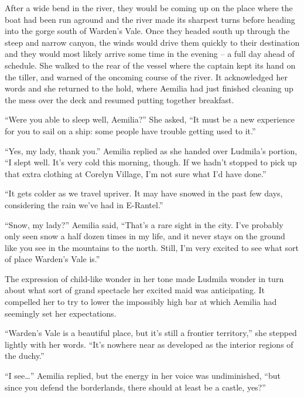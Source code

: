  

After a wide bend in the river, they would be coming up on the place where the boat had been run aground and the river made its sharpest turns before heading into the gorge south of Warden’s Vale. Once they headed south up through the steep and narrow canyon, the winds would drive them quickly to their destination and they would most likely arrive some time in the evening – a full day ahead of schedule. She walked to the rear of the vessel where the captain kept its hand on the tiller, and warned of the oncoming course of the river. It acknowledged her words and she returned to the hold, where Aemilia had just finished cleaning up the mess over the deck and resumed putting together breakfast.

 

“Were you able to sleep well, Aemilia?” She asked, “It must be a new experience for you to sail on a ship: some people have trouble getting used to it.”

 

“Yes, my lady, thank you.” Aemilia replied as she handed over Ludmila’s portion, “I slept well. It’s very cold this morning, though. If we hadn’t stopped to pick up that extra clothing at Corelyn Village, I’m not sure what I’d have done.”

 

“It gets colder as we travel upriver. It may have snowed in the past few days, considering the rain we’ve had in E-Rantel.”

 

“Snow, my lady?” Aemilia said, “That’s a rare sight in the city. I’ve probably only seen snow a half dozen times in my life, and it never stays on the ground like you see in the mountains to the north. Still, I’m very excited to see what sort of place Warden’s Vale is.”

 

The expression of child-like wonder in her tone made Ludmila wonder in turn about what sort of grand spectacle her excited maid was anticipating. It compelled her to try to lower the impossibly high bar at which Aemilia had seemingly set her expectations.

 

“Warden’s Vale is a beautiful place, but it’s still a frontier territory,” she stepped lightly with her words. “It’s nowhere near as developed as the interior regions of the duchy.”

 

“I see…” Aemilia replied, but the energy in her voice was undiminished, “but since you defend the borderlands, there should at least be a castle, yes?”

